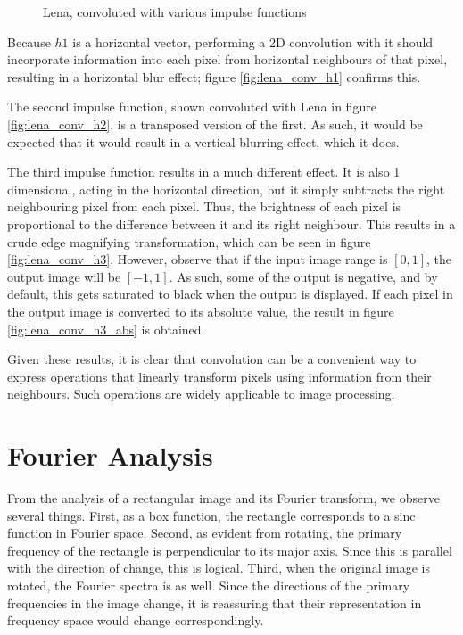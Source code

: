 \documentclass{sydeStyle}
\begin{document}
 \begin{figure}
	\begin{center}
	\end{center}
	\caption{Lena, convoluted with various impulse functions}
	\label{SummingAmp2}
\end{figure}

Because $h1$ is a horizontal vector, performing a 2D convolution with it should
incorporate information into each pixel from horizontal neighbours of that pixel,
resulting in a horizontal blur effect; figure \ref{fig:lena_conv_h1} confirms this.

The second impulse function, shown convoluted with Lena in figure
\ref{fig:lena_conv_h2}, is a transposed version of the first.  As such, it would
be expected that it would result in a vertical blurring effect, which it does.

The third impulse function results in a much different effect.
It is also 1 dimensional, acting in the horizontal direction, but it simply
subtracts the right neighbouring pixel from each pixel.
Thus, the brightness of each pixel is proportional to the difference between it
and its right neighbour.
This results in a crude edge magnifying transformation, which can be seen in
figure \ref{fig:lena_conv_h3}.
However, observe that if the input image range is $[0,1]$, the output image will
be $[-1,1]$.
As such, some of the output is negative, and by default, this gets saturated to
black when the output is displayed.
If each pixel in the output image is converted to its absolute value, the result
in figure \ref{fig:lena_conv_h3_abs} is obtained.

Given these results, it is clear that convolution can be a convenient way to
express operations that linearly transform pixels using information from their
neighbours.
Such operations are widely applicable to image processing.

\section*{Fourier Analysis}
From the analysis of a rectangular image and its Fourier transform, we observe several things.
First, as a box function, the rectangle corresponds to a sinc function in Fourier space.
Second, as evident from rotating, the primary frequency of the rectangle is perpendicular to its major axis.
Since this is parallel with the direction of change, this is logical.
Third, when the original image is rotated, the Fourier spectra is as well.
Since the directions of the primary frequencies in the image change, it is reassuring that their representation in frequency space would change correspondingly.
\end{document}
